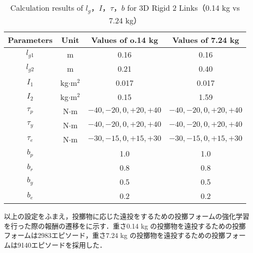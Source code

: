 \begin{table}[tb]
  \begin{center}
    \caption{Calculation results of $l_{g}$，$I$，$\tau$，$b$ for 3D Rigid 2 Links（0.14 kg vs 7.24 kg）}
    \begin{tabular}{c|c|c|c}
      \hline
      Parameters & Unit & Values of o.14 kg & Values of 7.24 kg \\
      \hline
      $l_{g1}$ & m & 0.16 & 0.16 \\
      $l_{g2}$ & m & 0.21 & 0.40 \\
      $I_{1}$ & kg$\cdot$$\mathrm{m}^2$ & 0.017 & 0.017 \\
      $I_{2}$ & kg$\cdot$$\mathrm{m}^2$ & 0.15 & 1.59 \\
      $\tau_{p}$ & N$\cdot$m & $-40, -20, 0, +20, +40$ & $-40, -20, 0, +20, +40$ \\
      $\tau_{y}$ & N$\cdot$m & $-40, -20, 0, +20, +40$ & $-40, -20, 0, +20, +40$ \\
      $\tau_{e}$ & N$\cdot$m & $-30, -15, 0, +15, +30$ & $-30, -15, 0, +15, +30$ \\
      $b_{p}$ &  & 1.0 & 1.0\\
      $b_{r}$ &  & 0.8 & 0.8\\
      $b_{y}$ &  & 0.5 & 0.5\\
      $b_{e}$ &  & 0.2 & 0.2\\
      \hline
    \end{tabular}
  \end{center}
\end{table}

以上の設定をふまえ，投擲物に応じた遠投をするための投擲フォームの強化学習を行った際の報酬の遷移をに示す．重さ0.14 kg の投擲物を遠投するための投擲フォームは2983エピソード，重さ7.24 kg の投擲物を遠投するための投擲フォームは9140エピソードを採用した．


